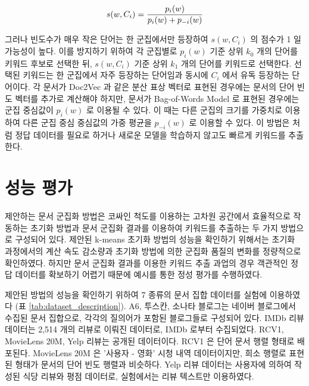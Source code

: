 \documentclass[oneside, ko,phd]{snuthesis_utf8_kor}
\begin{document}
\begin{equation}
\label{eq:proposed_labeler}
\centering
s(w, C_i) = \frac{p_i (w)}{p_i (w) + p_{-i}(w)}
\end{equation}

그러나 빈도수가 매우 작은 단어는 한 군집에서만 등장하여 $s(w, C_i)$ 의 점수가 1 일 가능성이 높다.
이를 방지하기 위하여 각 군집별로 $p_i (w)$ 기준 상위 $k_0$ 개의 단어를 키워드 후보로 선택한 뒤, $s(w, C_i)$ 기준 상위 $k_1$ 개의 단어를 키워드로 선택한다.
선택된 키워드는 한 군집에서 자주 등장하는 단어임과 동시에 $C_i$ 에서 유독 등장하는 단어이다.
각 문서가 Doc2Vec 과 같은 분산 표상 벡터로 표현된 경우에는 문서의 단어 빈도 벡터를 추가로 계산해야 하지만, 문서가 Bag-of-Words Model 로 표현된 경우에는 군집 중심값이 $p_i (w)$ 로 이용될 수 있다.
이 때는 다른 군집의 크기를 가중치로 이용하여 다른 군집 중심 중심값의 가중 평균을 $p_{-i}(w)$ 로 이용할 수 있다.
이 방법은 \cite{zhang2006keyword, onan2016ensemble} 처럼 정답 데이터를 필요로 하거나 새로운 모델을 학습하지 않고도 빠르게 키워드를 추출한다.


\section{성능 평가}

제안하는 문서 군집화 방법은 코싸인 척도를 이용하는 고차원 공간에서 효율적으로 작동하는 초기화 방법과 문서 군집화 결과를 이용하여 키워드를 추출하는 두 가지 방법으로 구성되어 있다.
제안된 k-means 초기화 방법의 성능을 확인하기 위해서는 초기화 과정에서의 계산 속도 감소량과 초기화 방법에 의한 군집화 품질의 변화를 정량적으로 확인하였다.
하지만 문서 군집화 결과를 이용한 키워드 추출 과업의 경우 객관적인 정답 데이터를 확보하기 어렵기 때문에 예시를 통한 정성 평가를 수행하였다.

제안된 방법의 성능을 확인하기 위하여 7 종류의 문서 집합 데이터를 실험에 이용하였다 (표 \ref{tab:dataset_description}).
A6, 투스칸, 소나타 블로그는 네이버 블로그에서 수집된 문서 집합으로, 각각의 질의어가 포함된 블로그들로 구성되어 있다.
IMDb 리뷰 데이터는 2,514 개의 리뷰로 이뤄진 데이터로, IMDb 로부터 수집되었다.
RCV1, MovieLens 20M, Yelp 리뷰는 공개된 데이터이다.
RCV1 은 단어 문서 행렬 형태로 배포된다.
MovieLens 20M 은 '사용자 - 영화' 시청 내역 데이터이지만, 희소 행렬로 표현된 형태가 문서의 단어 빈도 행렬과 비슷하다.
Yelp 리뷰 데이터는 사용자에 의하여 작성된 식당 리뷰와 평점 데이터로, 실험에서는 리뷰 텍스트만 이용하였다.
\end{document}
